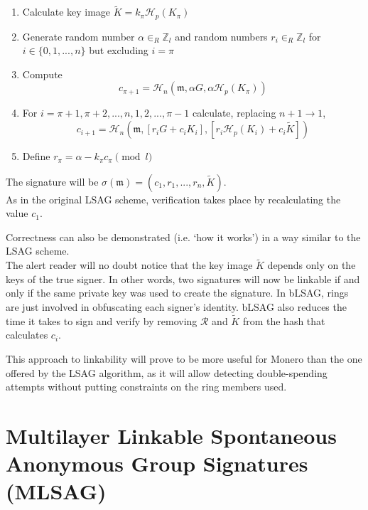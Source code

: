 \begin{enumerate}
	\item Calculate key image \(\tilde{K} = k_\pi \mathcal{H}_p(K_\pi)\)
	
	\item Generate random number \(\alpha \in_R \mathbb{Z}_l\) and random numbers  \(r_i \in_R \mathbb{Z}_l\) for \(i \in \{0, 1, ..., n\}\) but excluding \(i = \pi\)
	
	\item Compute
	\[c_{\pi+1} = \mathcal{H}_n(\mathfrak{m}, \alpha G, \alpha \mathcal{H}_p(K_\pi))\]
	
	\item For \(i = \pi+1, \pi+2, ..., n, 1, 2, ..., \pi-1\) calculate, replacing \(n + 1 \rightarrow 1\),
	\[  c_{i+1} = \mathcal{H}_n(\mathfrak{m}, [r_i G + c_i K_i], [r_i \mathcal{H}_p(K_i) + c_i \tilde{K}])  \] 
	
	
	\item Define \(r_\pi = \alpha -k_\pi c_\pi \pmod l\)
	
\end{enumerate}

The signature will be \(\sigma(\mathfrak{m}) = (c_1, r_1, ..., r_n, \tilde{K}) \).
\\

As in the original LSAG scheme, verification takes place by recalculating the value \(c_1\).

Correctness can also be demonstrated (i.e. `how it works') in a way similar to the LSAG scheme.
\\

The alert reader will no doubt notice that the key image $\tilde{K}$ depends only on the keys of the true signer. In other words, two signatures will now be linkable if and only if the same private key was used to create the signature. In bLSAG, rings are just involved in obfuscating each signer’s identity. bLSAG also reduces the time it takes to sign and verify by removing $\mathcal{R}$ and $\tilde{K}$ from the hash that calculates $c_i$.

This approach to linkability will prove to be more useful for Monero than the one offered by the LSAG algorithm, as it will allow detecting double-spending attempts without putting constraints on the ring members used.



\section{Multilayer Linkable Spontaneous Anonymous Group Signatures (MLSAG)}
\label{sec:MLSAG}

